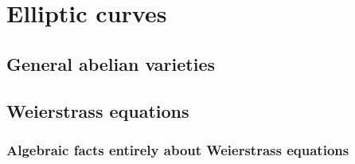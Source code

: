 
\section{Elliptic curves}

\subsection{General abelian varieties}






\subsection{Weierstrass equations}


% 
% 
\subsubsection{Algebraic facts entirely about Weierstrass equations}














